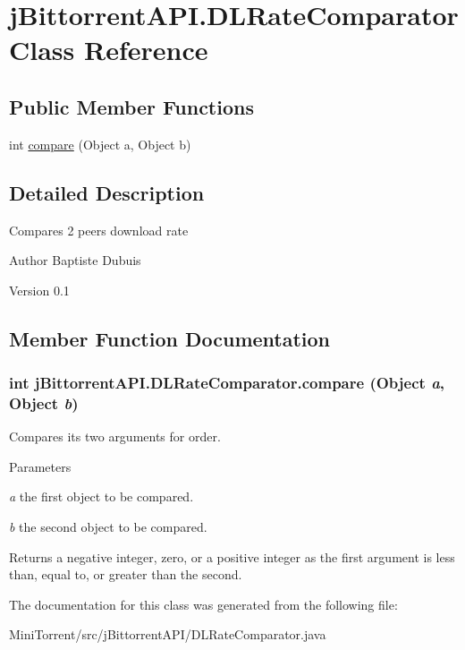 \hypertarget{classj_bittorrent_a_p_i_1_1_d_l_rate_comparator}{
\section{jBittorrentAPI.DLRateComparator Class Reference}
\label{classj_bittorrent_a_p_i_1_1_d_l_rate_comparator}
}
\subsection*{Public Member Functions}
\begin{DoxyCompactItemize}
\item 
int \hyperlink{classj_bittorrent_a_p_i_1_1_d_l_rate_comparator_ad6f022a081ac990bba2fec71c6e7d6aa}{compare} (Object a, Object b)
\end{DoxyCompactItemize}


\subsection{Detailed Description}
Compares 2 peers download rate

\begin{DoxyAuthor}{Author}
Baptiste Dubuis 
\end{DoxyAuthor}
\begin{DoxyVersion}{Version}
0.1 
\end{DoxyVersion}


\subsection{Member Function Documentation}
\hypertarget{classj_bittorrent_a_p_i_1_1_d_l_rate_comparator_ad6f022a081ac990bba2fec71c6e7d6aa}{
\subsubsection[{compare}]{\setlength{\rightskip}{0pt plus 5cm}int jBittorrentAPI.DLRateComparator.compare (Object {\em a}, \/  Object {\em b})}}
\label{classj_bittorrent_a_p_i_1_1_d_l_rate_comparator_ad6f022a081ac990bba2fec71c6e7d6aa}
Compares its two arguments for order.


\begin{DoxyParams}{Parameters}
\item[{\em a}]the first object to be compared. \item[{\em b}]the second object to be compared. \end{DoxyParams}
\begin{DoxyReturn}{Returns}
a negative integer, zero, or a positive integer as the first argument is less than, equal to, or greater than the second. 
\end{DoxyReturn}


The documentation for this class was generated from the following file:\begin{DoxyCompactItemize}
\item 
MiniTorrent/src/jBittorrentAPI/DLRateComparator.java\end{DoxyCompactItemize}
